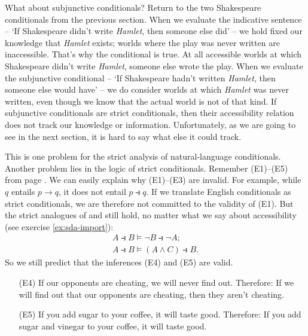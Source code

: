 What about subjunctive conditionals? Return to the two Shakespeare conditionals
from the previous section. When we evaluate the indicative sentence -- `If
Shakespeare didn't write \emph{Hamlet}, then someone else did' -- we hold fixed
our knowledge that \emph{Hamlet} exists; worlds where the play was never written
are inaccessible. That's why the conditional is true. At all accessible worlds
at which Shakespeare didn't write \emph{Hamlet}, someone else wrote the play.
When we evaluate the subjunctive conditional -- `If Shakespeare hadn't written
\emph{Hamlet}, then someone else would have' -- we do consider worlds at which
\emph{Hamlet} was never written, even though we know that the actual world is
not of that kind. If subjunctive conditionals are strict conditionals, then
their accessibility relation does not track our knowledge or information.
Unfortunately, as we are going to see in the next section, it is hard to say
what else it could track.

This is one problem for the strict analysis of natural-language conditionals.
Another problem lies in the logic of strict conditionals. Remember (E1)--(E5)
from page \pageref{paradoxes-mat-imp}. We can easily explain why (E1)--(E3) are
invalid. For example, while $q$ entails $p \to q$, it does not entail
$p \strictif q$. If we translate English conditionals as strict conditionals, we
are therefore not committed to the validity of (E1). But the strict analogues of
 and  still hold, no matter what we say about accessibility (see
exercise \ref{ex:sda-import}):
\begin{gather*}
  A \strictif B \models \neg B\strictif \neg A;\\
  A \strictif B \models (A\land C) \strictif  B.
\end{gather*}
So we still predict that the inferences (E4) and (E5) are valid.

\begin{enumerate}[leftmargin=12mm]
  \itemsep1mm
  \item[(E4)] If our opponents are cheating, we will never find out. Therefore:
        If we will find out that our opponents are cheating, then they aren't
        cheating.
  \item[(E5)] If you add sugar to your coffee, it will taste good. Therefore: If
        you add sugar and vinegar to your coffee, it will taste good.
\end{enumerate}

